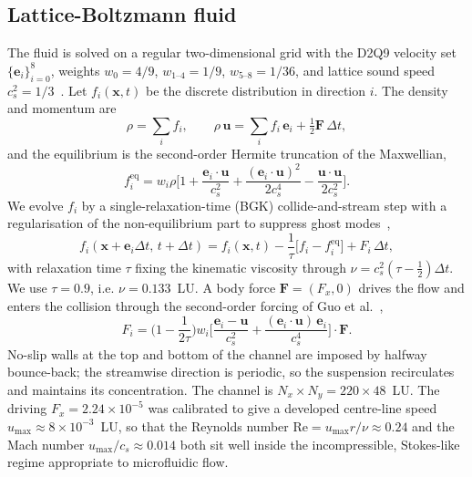 \documentclass[11pt,a4paper]{article}
\begin{document}
\subsection{Lattice-Boltzmann fluid}
\label{sec:lbm}

The fluid is solved on a regular two-dimensional grid with the D2Q9
velocity set $\{\boldsymbol e_i\}_{i=0}^{8}$, weights $w_0=4/9$,
$w_{1\text{--}4}=1/9$, $w_{5\text{--}8}=1/36$, and lattice sound speed
$c_s^2=1/3$~\citep{kruger2017lattice}. Let $f_i(\boldsymbol x,t)$ be the
discrete distribution in direction $i$. The density and momentum are
\begin{equation}
\rho=\sum_i f_i, \qquad
\rho\,\boldsymbol u=\sum_i f_i\,\boldsymbol e_i+\tfrac{1}{2}\boldsymbol F\,\Delta t,
\label{eq:moments}
\end{equation}
and the equilibrium is the second-order Hermite truncation of the
Maxwellian,
\begin{equation}
f_i^{\mathrm{eq}}=w_i\rho\Big[1
+\frac{\boldsymbol e_i\!\cdot\!\boldsymbol u}{c_s^2}
+\frac{(\boldsymbol e_i\!\cdot\!\boldsymbol u)^2}{2c_s^4}
-\frac{\boldsymbol u\!\cdot\!\boldsymbol u}{2c_s^2}\Big].
\label{eq:feq}
\end{equation}
We evolve $f_i$ by a single-relaxation-time (BGK) collide-and-stream
step with a regularisation of the non-equilibrium part to suppress
ghost modes~\citep{latt2006lattice},
\begin{equation}
f_i(\boldsymbol x+\boldsymbol e_i\Delta t,\,t+\Delta t)
=f_i(\boldsymbol x,t)
-\frac{1}{\tau}\big[f_i-f_i^{\mathrm{eq}}\big]
+F_i\,\Delta t,
\label{eq:bgk}
\end{equation}
with relaxation time $\tau$ fixing the kinematic viscosity through
$\nu=c_s^2(\tau-\tfrac12)\Delta t$. We use $\tau=0.9$, i.e.
$\nu=0.133$~LU. A body force $\boldsymbol F=(F_x,0)$ drives the flow and
enters the collision through the second-order forcing of Guo et
al.~\citep{guo2002discrete},
\begin{equation}
F_i=\Big(1-\frac{1}{2\tau}\Big)w_i
\Big[\frac{\boldsymbol e_i-\boldsymbol u}{c_s^2}
+\frac{(\boldsymbol e_i\!\cdot\!\boldsymbol u)\,\boldsymbol e_i}{c_s^4}\Big]
\!\cdot\!\boldsymbol F .
\label{eq:guo}
\end{equation}
No-slip walls at the top and bottom of the channel are imposed by
halfway bounce-back; the streamwise direction is periodic, so the
suspension recirculates and maintains its concentration. The channel is
$N_x\times N_y=220\times 48$~LU. The driving $F_x=2.24\times10^{-5}$ was
calibrated to give a developed centre-line speed
$u_{\max}\approx 8\times10^{-3}$~LU, so that the Reynolds number
$\mathrm{Re}=u_{\max}r/\nu\approx 0.24$ and the Mach number
$u_{\max}/c_s\approx 0.014$ both sit well inside the incompressible,
Stokes-like regime appropriate to microfluidic flow.
\end{document}

